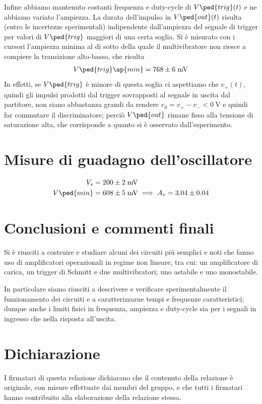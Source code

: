 \documentclass[10pt, a4paper, italian]{article}
\begin{document}
Infine abbiamo mantenuto costanti frequenza e duty-cycle di $V\ped{trig} (t)$
e ne abbiamo variato l'ampiezza. La durata dell'impulso in $V\ped{out} (t)$
risulta (entro le incertezze sperimentali) indipendente dall'ampiezza del
segnale di trigger per valori di $V\ped{trig}$ maggiori di una certa soglia.
Si è misurato con i cursori l'ampiezza minima al di sotto della quale
il multivibratore non riesce a compiere la transizione alto-basso,
che risulta
\begin{align*}
V\ped{trig}\ap{min} = 768 \pm 6 \; \si{m\V}
\end{align*}
In effetti, se $V\ped{trig}$ è minore di questa soglia ci aspettiamo
che $v_+ (t)$, quindi gli impulsi prodotti dal trigger sovrapposti al segnale
in uscita dal partitore, non siano abbastanza grandi da rendere
$v_d = v_+ - v_- < \SI{0}{\V}$ e quindi far commutare il discriminatore; perciò
$V\ped{out}$ rimane fisso alla tensione di saturazione alta, che
corrisponde a quanto si è osservato dall'esperimento.

\section{Misure di guadagno dell'oscillatore}
\begin{align*}
V_s &= 200 \pm 2 \; \si{m\V} \\
V\ped{min} &= 608 \pm 5 \; \si{m\V} \implies  A_v = 3.04 \pm 0.04
\end{align*}
\section*{Conclusioni e commenti finali}
Si è riusciti a costruire e studiare alcuni dei circuiti più semplici e noti
che fanno uso di amplificatori operazionali in regime non lineare, tra cui:
un amplificatore di carica, un trigger di Schmitt e due multivibratori; uno
astabile e uno monostabile.

In particolare siamo riusciti a descrivere e verificare sperimentalmente il
funzionamento dei circuiti e a caratterizzarne tempi e frequenze
caratteristici; dunque anche i limiti fisici in frequenza, ampiezza e
duty-cycle sia per i segnali in ingresso che nella risposta all'uscita.

\section*{Dichiarazione}
I firmatari di questa relazione dichiarano che il contenuto della relazione \`e
originale, con misure effettuate dai membri del gruppo, e che tutti i firmatari
hanno contribuito alla elaborazione della relazione stessa.
\end{document}
